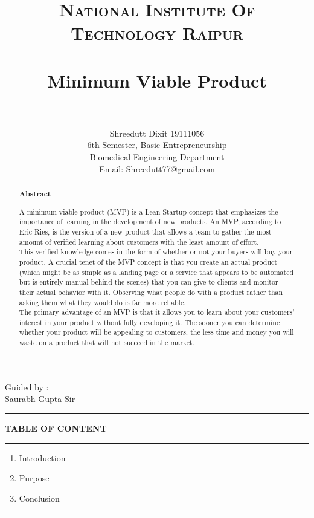 \documentclass[paper=a4, fontsize=11pt]{scrartcl}
\title{
		\usefont{OT1}{bch}{b}{n}
		\normalfont \normalsize \textsc{National Institute Of Technology Raipur} \\ [25pt]
		\horrule{0.5pt} \\[0.4cm]
		\huge Minimum Viable Product  \\
		\horrule{2pt} \\[0.5cm]
}
\author{
        Shreedutt Dixit 19111056\\6th Semester, 
        Basic Entrepreneurship\\ Biomedical Engineering Department\\	
        Email: Shreedutt77@gmail.com
        \normalsize
}
\date{}
\numberwithin{equation}{section}		%
\numberwithin{figure}{section}			%
\numberwithin{table}{section}				%
\begin{document}
\maketitle
\begin{flushright}
    Guided by :\\
    Saurabh Gupta Sir
\end{flushright}

\noindent\rule{\textwidth}{1pt}
\begin{abstract}

    \begin{center}
        \Large{\textbf{Abstract}}\\
        
    \end{center}

    \Large { A minimum viable product (MVP) is a Lean Startup concept that emphasizes the importance of learning in the development of new products. An MVP, according to Eric Ries, is the version of a new product that allows a team to gather the most amount of verified learning about customers with the least amount of effort.\\
    This verified knowledge comes in the form of whether or not your buyers will buy your product.
    A crucial tenet of the MVP concept is that you create an actual product (which might be as simple as a landing page or a service that appears to be automated but is entirely manual behind the scenes) that you can give to clients and monitor their actual behavior with it. 
    \newpage Observing what people do with a product rather than asking them what they would do is far more reliable.\\
    The primary advantage of an MVP is that it allows you to learn about your customers' interest in your product without fully developing it. The sooner you can determine whether your product will be appealing to customers, the less time and money you will waste on a product that will not succeed in the market. }
\end{abstract}

\newpage
\textbf{TABLE OF CONTENT}\\
\rule{\textwidth}{1pt}
\begin{enumerate}
    \item Introduction
    \item Purpose
    \item Conclusion
\end{enumerate}
\rule{\textwidth}{1pt}
\newpage
\Large
\end{document}
